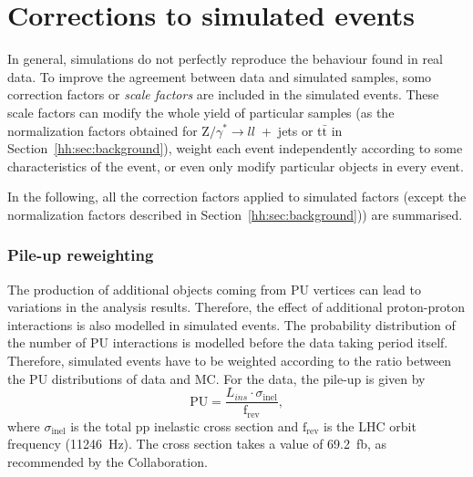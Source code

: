 \documentclass[../main.tex]{subfiles}
\begin{document}
\section{Corrections to simulated events}
\label{hh:sec:corrections}

In general, simulations do not perfectly reproduce the behaviour found in real data. To improve the agreement between data and simulated samples, somo correction factors or \textit{scale factors}  are included in the simulated events. These scale factors can modify the whole yield of particular samples (as the normalization factors obtained for Z$/\gamma^*\to ll$~+~jets or t$\bar{\text{t}}$ in Section~\ref{hh:sec:background}), weight each event independently according to some characteristics of the event, or even only modify particular objects in every event.

In the following, all the correction factors applied to simulated factors (except the normalization factors described in Section~\ref{hh:sec:background})) are summarised.

\subsubsection*{Pile-up reweighting}
\label{hh:sec:pu}

The production of additional objects coming from PU vertices can lead to variations in the analysis results. Therefore, the effect of additional proton-proton interactions is also modelled in simulated events. The probability distribution of the number of PU interactions is modelled before the data taking period itself. Therefore, simulated events have to be weighted according to the ratio between the PU distributions of data and MC. For the data, the pile-up is given by
\begin{equation}
\text{PU} = \frac{L_{ins}\cdot\sigma_{\text{inel}}}{\text{f}_\text{rev}},
\end{equation}
where $\sigma_{\text{inel}}$ is the total pp inelastic cross section and $\text{f}_\text{rev}$ is the LHC orbit frequency (11246~Hz). The cross section takes a value of 69.2~fb, as recommended by the Collaboration.

\end{document}
